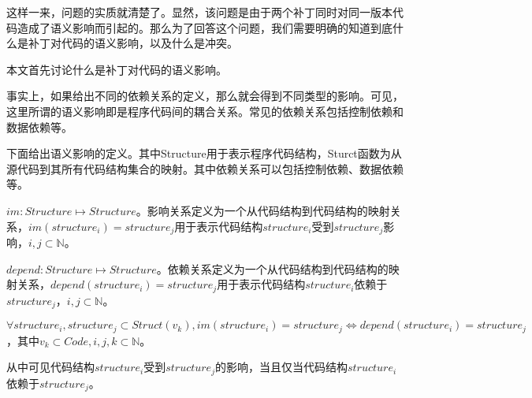这样一来，问题的实质就清楚了。显然，该问题是由于两个补丁同时对同一版本代码造成了语义影响而引起的。那么为了回答这个问题，我们需要明确的知道到底什么是补丁对代码的语义影响，以及什么是冲突。

本文首先讨论什么是补丁对代码的语义影响。



%	

事实上，如果给出不同的依赖关系的定义，那么就会得到不同类型的影响。可见，这里所谓的语义影响即是程序代码间的耦合关系。常见的依赖关系包括控制依赖和数据依赖等。

下面给出语义影响的定义。其中Structure用于表示程序代码结构，Sturct函数为从源代码到其所有代码结构集合的映射。其中依赖关系可以包括控制依赖、数据依赖等。



\begin{definition}
	$im: Structure \mapsto Structure$。影响关系定义为一个从代码结构到代码结构的映射关系，$im(structure_i) = structure_j$用于表示代码结构$structure_i$受到$structure_j$影响，$i,j \subset \mathbb{N}$。
\end{definition}

\begin{definition}
	$depend: Structure \mapsto Structure$。依赖关系定义为一个从代码结构到代码结构的映射关系，$depend(structure_i) = structure_j$用于表示代码结构$structure_i$依赖于$structure_j$，$i,j \subset \mathbb{N}$。
\end{definition}

\begin{definition}
	$\forall structure_i,structure_j \subset Struct(v_k),  im(structure_i) = structure_j \iff depend(structure_i) = structure_j$，其中$v_k \subset Code,i,j,k \subset \mathbb{N}$。
\end{definition}

从中可见代码结构$structure_i$受到$structure_j$的影响，当且仅当代码结构$structure_i$依赖于$structure_j$。


%

